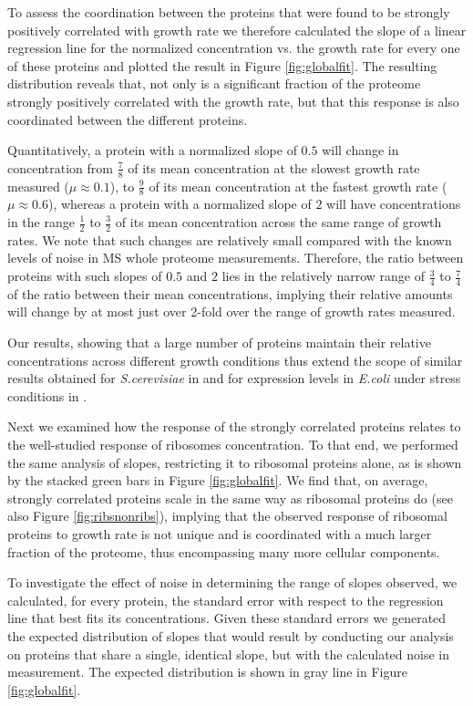 \documentclass[a4paper]{article}
\begin{document}
To assess the coordination between the proteins that were found to be strongly positively correlated with growth rate we therefore calculated the slope of a linear regression line for the normalized concentration vs. the growth rate for every one of these proteins and plotted the result in Figure \ref{fig:globalfit}.
The resulting distribution reveals that, not only is a significant fraction of the proteome strongly positively correlated with the growth rate, but that this response is also coordinated between the different proteins.

Quantitatively, a protein with a normalized slope of $0.5$ will change in concentration from $\frac{7}{8}$ of its mean concentration at the slowest growth rate measured ($\mu \approx 0.1$), to $\frac{9}{8}$ of its mean concentration at the fastest growth rate ($\mu \approx 0.6$), whereas a protein with a normalized slope of $2$ will have concentrations in the range $\frac{1}{2}$ to $\frac{3}{2}$ of its mean concentration across the same range of growth rates.
We note that such changes are relatively small compared with the known levels of noise in MS whole proteome measurements.
Therefore, the ratio between proteins with such slopes of $0.5$ and $2$ lies in the relatively narrow range of $\frac{3}{4}$ to $\frac{7}{4}$ of the ratio between their mean concentrations, implying their relative amounts will change by at most just over 2-fold over the range of growth rates measured.

Our results, showing that a large number of proteins maintain their relative concentrations across different growth conditions thus extend the scope of similar results obtained for \emph{S.cerevisiae} in \cite{Keren2013a} and for expression levels in \emph{E.coli} under stress conditions in \cite{Kaneko2014}.


Next we examined how the response of the strongly correlated proteins relates to the well-studied response of ribosomes concentration.
To that end, we performed the same analysis of slopes, restricting it to ribosomal proteins alone, as is shown by the stacked green bars in Figure \ref{fig:globalfit}.
We find that, on average, strongly correlated proteins scale in the same way as ribosomal proteins do (see also Figure \ref{fig:ribsnonribs}), implying that the observed response of ribosomal proteins to growth rate is not unique and is coordinated with a much larger fraction of the proteome, thus encompassing many more cellular components.

To investigate the effect of noise in determining the range of slopes observed, we calculated, for every protein, the standard error with respect to the regression line that best fits its concentrations.
Given these standard errors we generated the expected distribution of slopes that would result by conducting our analysis on proteins that share a single, identical slope, but with the calculated noise in measurement.
The expected distribution is shown in gray line in Figure \ref{fig:globalfit}.
\end{document}
